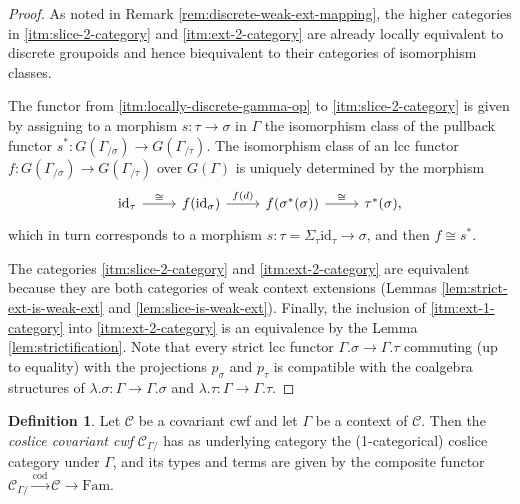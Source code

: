 \documentclass[a4paper]{article}
\theoremstyle{remark}
\theoremstyle{definition}
\newtheorem{definition}[theorem]{Definition}
\begin{document}
\begin{proof}
  As noted in Remark \ref{rem:discrete-weak-ext-mapping}, the higher categories in \ref{itm:slice-2-category} and \ref{itm:ext-2-category} are already locally equivalent to discrete groupoids and hence biequivalent to their categories of isomorphism classes.

  The functor from \ref{itm:locally-discrete-gamma-op} to \ref{itm:slice-2-category} is given by assigning to a morphism $s : \tau \rightarrow \sigma$ in $\Gamma$ the isomorphism class of the pullback functor $s^* : G(\Gamma_{/ \sigma}) \rightarrow G(\Gamma_{/ \tau})$.
  The isomorphism class of an lcc functor $f : G(\Gamma_{/ \sigma}) \rightarrow G(\Gamma_{/ \tau})$ over $G(\Gamma)$ is uniquely determined by the morphism
  \begin{equation}
    \begin{tikzcd}
      \mathrm{id}_\tau \arrow[r, "\cong"] & f(\mathrm{id}_\sigma) \arrow[r, "f(d)"] & f(\sigma^*(\sigma)) \arrow[r, "\cong"] & \tau^*(\sigma),
    \end{tikzcd}
  \end{equation}
  which in turn corresponds to a morphism $s : \tau = \Sigma_\tau \mathrm{id}_\tau \rightarrow \sigma$, and then $f \cong s^*$.

  The categories \ref{itm:slice-2-category} and \ref{itm:ext-2-category} are equivalent because they are both categories of weak context extensions (Lemmas \ref{lem:strict-ext-is-weak-ext} and \ref{lem:slice-is-weak-ext}).
  Finally, the inclusion of \ref{itm:ext-1-category} into \ref{itm:ext-2-category} is an equivalence by the Lemma \ref{lem:strictification}.
  Note that every strict lcc functor $\Gamma.\sigma \rightarrow \Gamma.\tau$ commuting (up to equality) with the projections $p_\sigma$ and $p_\tau$ is compatible with the coalgebra structures of $\lambda.\sigma : \Gamma \rightarrow \Gamma.\sigma$ and $\lambda.\tau : \Gamma \rightarrow \Gamma.\tau$.
\end{proof}

\begin{definition}
  Let $\mathcal{C}$ be a covariant cwf and let $\Gamma$ be a context of $ \mathcal{C}$.
  Then the \emph{coslice covariant cwf} $\mathcal{C}_{\Gamma /}$ has as underlying category the (1-categorical) coslice category under $\Gamma$, and its types and terms are given by the composite functor $\mathcal{C}_{\Gamma /} \xrightarrow{\mathrm{cod}} \mathcal{C} \rightarrow \mathrm{Fam}$.
\end{definition}
\end{document}
